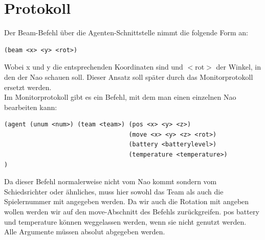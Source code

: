 \section*{Protokoll}
Der Beam-Befehl über die Agenten-Schnittstelle nimmt die folgende Form an:

\begin{verbatim}(beam <x> <y> <rot>)
\end{verbatim}
Wobei x und y die entsprechenden Koordinaten sind und $<$rot$>$ der
 Winkel, in den der Nao schauen soll. Dieser Ansatz soll später durch das Monitorprotokoll ersetzt 
werden.\\
Im Monitorprotokoll gibt es ein Befehl, mit dem man einen einzelnen Nao bearbeiten kann:

\begin{verbatim}(agent (unum <num>) (team <team>) (pos <x> <y> <z>)
                                  (move <x> <y> <z> <rot>)
                                  (battery <batterylevel>)
                                  (temperature <temperature>)
)
\end{verbatim}
Da dieser Befehl normalerweise nicht vom Nao kommt sondern vom 
Schiedsrichter oder ähnliches, muss hier sowohl das Team als auch die 
Spielernummer mit angegeben werden. Da wir auch die Rotation mit angeben
 wollen werden wir auf den move-Abschnitt des Befehls zurückgreifen. pos
 battery und temperature können weggelassen werden, wenn sie nicht 
genutzt werden.\\
Alle Argumente müssen absolut abgegeben werden.
